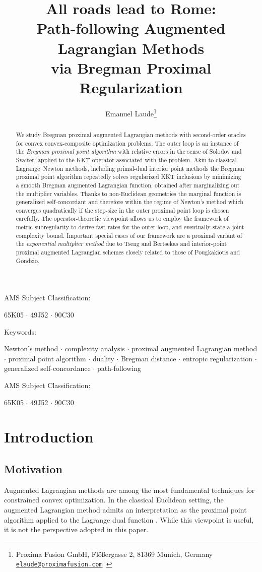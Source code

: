 \documentclass[11pt,onecolumn]{article}
\title{All roads lead to Rome: \\
Path-following Augmented Lagrangian Methods \\
via Bregman Proximal Regularization}
\author{Emanuel Laude\thanks{	Proxima Fusion GmbH,
		Fl\"o\ss ergasse 2, 81369 Munich, Germany~
		{\tt%
			\href{mailto:elaude@proximafusion.com}{elaude@proximafusion.com}%
		}
	}}
\newenvironment{keywords}{
\begin{paragraph}{Keywords:}
}
{
\end{paragraph}
}
\newenvironment{subclass}{
\begin{paragraph}{AMS Subject Classification:}
}
{\end{paragraph}
}
\theoremstyle{remark}
\begin{document}
\maketitle
\begin{abstract}
We study Bregman proximal augmented Lagrangian methods with second-order oracles for convex convex-composite optimization problems. 
The outer loop is an instance of the \emph{Bregman proximal point algorithm} with relative errors in the sense of Solodov and Svaiter, applied to the KKT operator associated with the problem.
Akin to classical Lagrange--Newton methods, including primal-dual interior point methods the Bregman proximal point algorithm repeatedly solves regularized KKT inclusions by minimizing a smooth Bregman augmented Lagrangian function, obtained after marginalizing out the multiplier variables. Thanks to non-Euclidean geometries the marginal function is generalized self-concordant and therefore within the regime of Newton's method which converges quadratically if the step-size in the outer proximal point loop is chosen carefully.
The operator-theoretic viewpoint allows us to employ the framework of metric subregularity to derive fast rates for the outer loop, and eventually state a joint complexity bound.
Important special cases of our framework are a proximal variant of the \emph{exponential multiplier method} due to Tseng and Bertsekas and interior-point proximal augmented Lagrangian schemes closely related to those of Pougkakiotis and Gondzio.
\end{abstract}


\begin{subclass}
65K05 $\cdot$ 49J52 $\cdot$ 90C30
\end{subclass}
\begin{keywords}
Newton's method $\cdot$ complexity analysis $\cdot$ proximal augmented Lagrangian method $\cdot$ proximal point algorithm $\cdot$ duality $\cdot$ Bregman distance $\cdot$ entropic regularization $\cdot$ generalized self-concordance $\cdot$ path-following
\end{keywords}
\begin{subclass}
65K05 $\cdot$ 49J52 $\cdot$ 90C30
\end{subclass}
\tableofcontents

\section{Introduction}
\subsection{Motivation}
Augmented Lagrangian methods are among the most fundamental techniques for constrained convex optimization.
In the classical Euclidean setting, the augmented Lagrangian method admits an interpretation as the proximal point algorithm applied to the Lagrange dual function \cite{rockafellar1976augmented}.
While this viewpoint is useful, it is not the perspective adopted in this paper.
\end{document}
